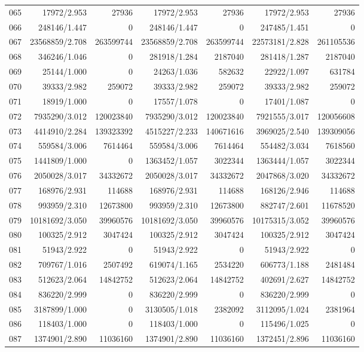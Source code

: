 \begin{longtable}{crrrrrr}
065 & 17972/2.953 & 27936 & 17972/2.953 & 27936 & 17972/2.953 & 27936 \\
066 & 248146/1.447 & 0 & 248146/1.447 & 0 & 247485/1.451 & 0 \\
067 & 23568859/2.708 & 263599744 & 23568859/2.708 & 263599744 & 22573181/2.828 & 261105536 \\
068 & 346246/1.046 & 0 & 281918/1.284 & 2187040 & 281418/1.287 & 2187040 \\
069 & 25144/1.000 & 0 & 24263/1.036 & 582632 & 22922/1.097 & 631784 \\
070 & 39333/2.982 & 259072 & 39333/2.982 & 259072 & 39333/2.982 & 259072 \\
071 & 18919/1.000 & 0 & 17557/1.078 & 0 & 17401/1.087 & 0 \\
072 & 7935290/3.012 & 120023840 & 7935290/3.012 & 120023840 & 7921555/3.017 & 120056608 \\
073 & 4414910/2.284 & 139323392 & 4515227/2.233 & 140671616 & 3969025/2.540 & 139309056 \\
074 & 559584/3.006 & 7614464 & 559584/3.006 & 7614464 & 554482/3.034 & 7618560 \\
075 & 1441809/1.000 & 0 & 1363452/1.057 & 3022344 & 1363444/1.057 & 3022344 \\
076 & 2050028/3.017 & 34332672 & 2050028/3.017 & 34332672 & 2047868/3.020 & 34332672 \\
077 & 168976/2.931 & 114688 & 168976/2.931 & 114688 & 168126/2.946 & 114688 \\
078 & 993959/2.310 & 12673800 & 993959/2.310 & 12673800 & 882747/2.601 & 11678520 \\
079 & 10181692/3.050 & 39960576 & 10181692/3.050 & 39960576 & 10175315/3.052 & 39960576 \\
080 & 100325/2.912 & 3047424 & 100325/2.912 & 3047424 & 100325/2.912 & 3047424 \\
081 & 51943/2.922 & 0 & 51943/2.922 & 0 & 51943/2.922 & 0 \\
082 & 709767/1.016 & 2507492 & 619074/1.165 & 2534220 & 606773/1.188 & 2481484 \\
083 & 512623/2.064 & 14842752 & 512623/2.064 & 14842752 & 402691/2.627 & 14842752 \\
084 & 836220/2.999 & 0 & 836220/2.999 & 0 & 836220/2.999 & 0 \\
085 & 3187899/1.000 & 0 & 3130505/1.018 & 2382092 & 3112095/1.024 & 2381964 \\
086 & 118403/1.000 & 0 & 118403/1.000 & 0 & 115496/1.025 & 0 \\
087 & 1374901/2.890 & 11036160 & 1374901/2.890 & 11036160 & 1372451/2.896 & 11036160 \\

\end{longtable}
